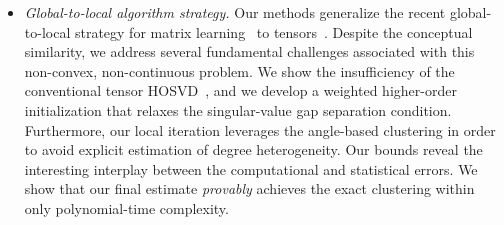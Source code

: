 \documentclass[journal]{IEEEtran}
\theoremstyle{definition}
\theoremstyle{definition}
\begin{document}
\begin{itemize}[wide]
    \item \textit{Global-to-local algorithm strategy.} Our methods generalize the recent global-to-local strategy for matrix learning~\citep{gao2018community,chi2019nonconvex,yun2016optimal} to tensors~\citep{han2020exact,ahn2018hypergraph,kim2018stochastic}. Despite the conceptual similarity, we address several fundamental challenges associated with this non-convex, non-continuous problem. We show the insufficiency of the conventional tensor HOSVD~\citep{de2000multilinear}, and we develop a weighted higher-order initialization that relaxes the singular-value gap separation condition. Furthermore, our local iteration leverages the angle-based clustering in order to avoid explicit estimation of degree heterogeneity. Our bounds reveal the interesting interplay between the computational and statistical errors. We show that our final estimate \emph{provably} achieves the exact clustering within only polynomial-time complexity. 
    
\end{itemize}



\begin{table}[t]
    \caption{ Comparison between previous methods with our method. $^*$We list the result for order-K tensors with $K \geq 3$ and general number of communities $r = \tO(1)$. $^{**}$The parameter $\alpha = f(p) > 0$ denotes the sparsity level which is some function of dimension $p$. }\label{tab:comp}
\end{table}
\end{document}
